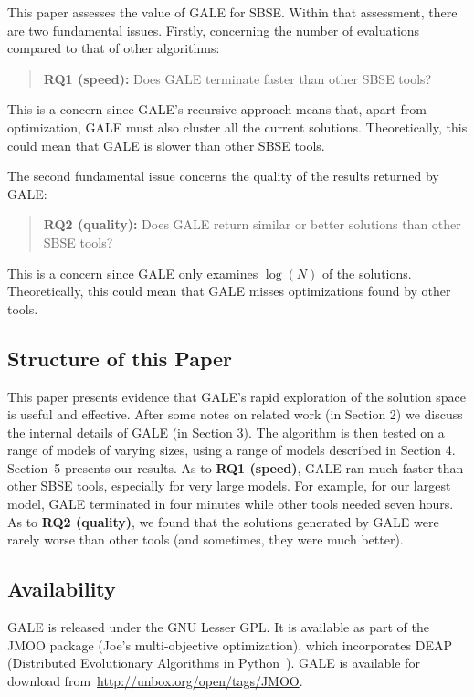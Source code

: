 \documentclass[10pt,journal,compsoc]{IEEEtran}
\begin{document}
This paper assesses the value of GALE for SBSE.
Within that assessment, there are two fundamental issues.
Firstly,  concerning  the  number  of  evaluations compared  to  that  of  other  algorithms:
\begin{quote}
{\bf RQ1 (speed):} Does GALE terminate faster than other SBSE tools?
\end{quote}
This is a concern since GALE's recursive approach means that, apart from optimization,
GALE must also cluster all the current solutions.
Theoretically, this could mean that   GALE is  slower than other SBSE tools.

The second fundamental issue  
concerns  the  quality  of  the  results  returned by GALE:
\begin{quote}
{\bf RQ2 (quality):} Does GALE return similar or better
solutions than other SBSE tools?
\end{quote}
This is a concern since GALE only examines $\log(N)$ of the solutions.
Theoretically, this could mean that GALE misses  optimizations
 found by other tools.



\subsection{Structure of this Paper}
This paper presents evidence that GALE's rapid exploration of the solution space
is useful and effective.
After some notes on related work (in Section 2)
we discuss the internal details of GALE (in Section 3). 
The algorithm is then tested on a range of models of varying sizes, using
a range of models described in Section 4.
Section~5 presents our results.
As to {\bf RQ1 (speed)}, GALE ran much faster than
other SBSE tools, especially for very large models.
For example, 
for our largest model, GALE terminated in four minutes
while other tools needed seven hours.
As to {\bf RQ2 (quality)}, we found that the 
solutions generated by GALE were rarely worse than other tools (and sometimes,
they were much better). 


\subsection{Availability}

GALE is released under the GNU Lesser GPL. 
It is available as part of the JMOO package (Joe's multi-objective optimization), which
incorporates DEAP (Distributed Evolutionary Algorithms in Python~\cite{jmlr12}).
GALE is available for  download 
from~\url{http://unbox.org/open/tags/JMOO}.
\end{document}
